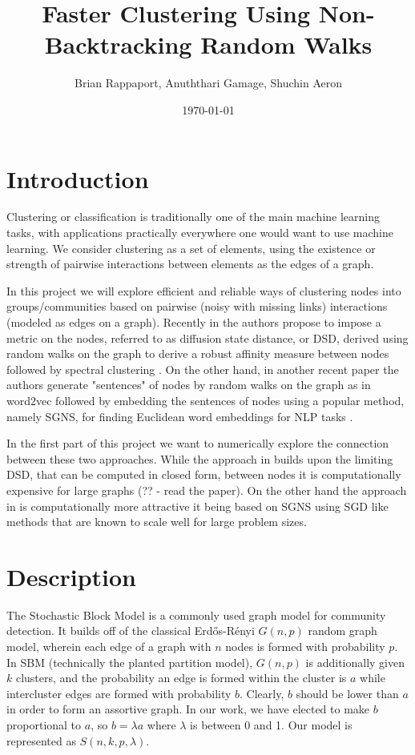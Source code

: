 \documentclass{article}
\title{Faster Clustering Using Non-Backtracking Random Walks}
\author{Brian Rappaport, Anuththari Gamage, Shuchin Aeron}
\affil{Tufts University}
\date{\today}
\begin{document}
\maketitle

\begin{abstract}

\end{abstract}


\section{Introduction}

Clustering or classification is traditionally one of the main machine learning tasks, with applications practically everywhere one would want to use machine learning. We consider clustering as a set of elements, using the existence or strength of pairwise interactions between elements as the edges of a graph. 

In this project we will explore efficient and reliable ways of clustering nodes into groups/communities based on pairwise (noisy with missing links) interactions (modeled as edges on a graph). Recently in \cite{DSD} the authors propose to impose a metric on the nodes, referred to as diffusion state distance, or DSD, derived using random walks on the graph to derive a robust affinity measure between nodes followed by spectral clustering \cite{Luxburg}. On the other hand, in another recent paper \cite{NodeEmbed} the authors generate "sentences" of nodes by random walks on the graph as in word2vec \cite{word2vec} followed by embedding the sentences of nodes using a popular method, namely SGNS, for finding Euclidean word embeddings for NLP tasks \cite{LevyGoldberg}.

In the first part of this project we want to numerically explore the connection between these two approaches. While the approach in \cite{DSD} builds upon the limiting DSD, that can be computed in closed form, between nodes it is computationally expensive for large graphs (?? - read the paper). On the other hand the approach in \cite{NodeEmbed} is computationally more attractive it being based on SGNS using SGD like methods that are known to scale well for large problem sizes.

\section{Description}

The Stochastic Block Model is a commonly used graph model for community detection. It builds off of the classical Erdős-Rényi $G(n,p)$ random graph model, wherein each edge of a graph with $n$ nodes is formed with probability $p$. In SBM (technically the planted partition model), $G(n,p)$ is additionally given $k$ clusters, and the probability an edge is formed within the cluster is $a$ while intercluster edges are formed with probability $b$. Clearly, $b$ should be lower than $a$ in order to form an assortive graph. In our work, we have elected to make $b$ proportional to $a$, so $b = \lambda a$ where $\lambda$ is between 0 and 1. Our model is represented as $S(n,k,p,\lambda)$.
\end{document}
